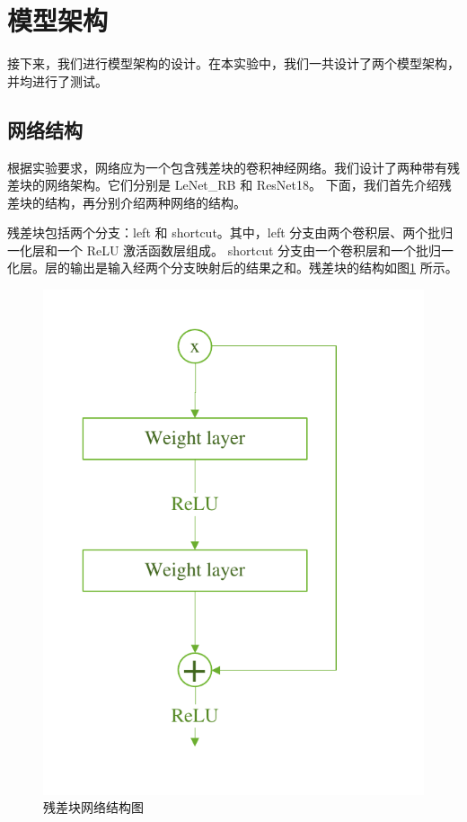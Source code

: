 \documentclass[supercite]{Experimental_Report}
\theoremstyle{definition}
\begin{document}
\section{模型架构}
接下来，我们进行模型架构的设计。在本实验中，我们一共设计了两个模型架构，并均进行了测试。
\subsection{网络结构}
根据实验要求，网络应为一个包含残差块的卷积神经网络。我们设计了两种带有残差块的网络架构。它们分别是 LeNet\_RB 和 ResNet18。
下面，我们首先介绍残差块的结构，再分别介绍两种网络的结构。

残差块包括两个分支：left 和 shortcut。其中，left 分支由两个卷积层、两个批归一化层和一个 ReLU 激活函数层组成。
shortcut 分支由一个卷积层和一个批归一化层。层的输出是输入经两个分支映射后的结果之和。残差块的结构如图\ref{残差块网络结构图}
所示。
\begin{figure}[H]
	\begin{center}
		\includegraphics[scale=0.7]{../images/残差块网络结构图.pdf}
		\caption{残差块网络结构图}
		\label{残差块网络结构图}
	\end{center}
\end{figure}
\end{document}
